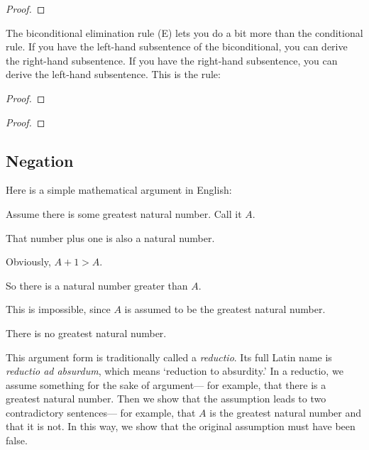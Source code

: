 \begin{proof}
	\open
		 
	\close
	\open
		 
	\close
\end{proof}

The biconditional elimination rule ({\eiff}E) lets you do a bit more than the conditional rule. If you have the left-hand subsentence of the biconditional, you can derive the right-hand subsentence. If you have the right-hand subsentence, you can derive the left-hand subsentence. This is the rule:

\begin{multicols}{2}
\begin{proof}
	 
\end{proof}

\begin{proof}
	 
\end{proof}
\end{multicols}




\subsection{Negation}
Here is a simple mathematical argument in English:
\begin{earg}
\item[] Assume there is some greatest natural number. Call it $A$.
\item[] That number plus one is also a natural number.
\item[] Obviously, $A+1 > A$.
\item[] So there is a natural number greater than $A$.
\item[] This is impossible, since $A$ is assumed to be the greatest natural number.
\item[\therefore] There is no greatest natural number.
\end{earg}
This argument form is traditionally called a \emph{reductio}. Its full Latin name is \emph{reductio ad absurdum}, which means `reduction to absurdity.' In a reductio, we assume something for the sake of argument--- for example, that there is a greatest natural number. Then we show that the assumption leads to two contradictory sentences--- for example, that $A$ is the greatest natural number and that it is not. In this way, we show that the original assumption must have been false.

